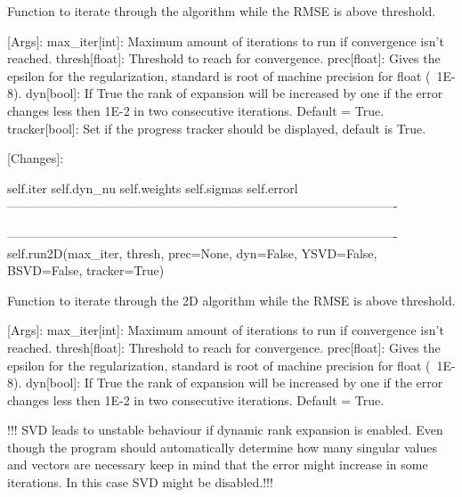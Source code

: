 \begin{DoxyVerb}
           Function to iterate through the algorithm while the RMSE is above threshold.
           
           [Args]:
                   max_iter[int]: Maximum amount of iterations to run if convergence isn't reached.
                   thresh[float]: Threshold to reach for convergence.
                   prec[float]: Gives the epsilon for the regularization, standard is root of machine 
                                  precision for float (~1E-8).
                   dyn[bool]: If True the rank of expansion will be increased by one if the error changes
                                  less then 1E-2 in two consecutive iterations. Default = True.
                   tracker[bool]: Set if the progress tracker should be displayed, default is True.
                   
           [Changes]:
               
               self.iter
               self.dyn_nu
               self.weights
               self.sigmas
               self.errorl
       ---------------------------------------------------------------------------------------------- 
                  
       ----------------------------------------------------------------------------------------------             
        self.run2D(max_iter, thresh, prec=None, dyn=False, YSVD=False, BSVD=False, tracker=True)
            
            Function to iterate through the 2D algorithm while the RMSE is above threshold.
            
            [Args]:
                   max_iter[int]: Maximum amount of iterations to run if convergence isn't reached.
                   thresh[float]: Threshold to reach for convergence.
                   prec[float]: Gives the epsilon for the regularization, standard is root of machine 
                                  precision for float (~1E-8).
                   dyn[bool]: If True the rank of expansion will be increased by one if the error changes
                                  less then 1E-2 in two consecutive iterations. Default = True.
                           
                           !!! SVD leads to unstable behaviour if dynamic rank expansion is enabled.
                               Even though the program should automatically determine how many singular
                               values and vectors are necessary keep in mind that the error might
                               increase in some iterations. In this case SVD might be disabled.!!!
                              

\end{DoxyVerb}
